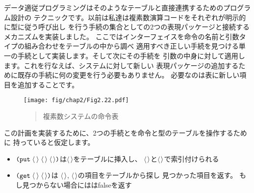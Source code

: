 データ適従プログラミングはそのようなテーブルと直接連携するためのプログラム設計の
テクニックです。以前は私達は複素数演算コードをそれぞれが明示的に型に従う呼び出し
を行う手続の集合としての2つの表現パッケージと接続するメカニズムを実装しました。
ここではインターフェイスを命令の名前と引数タイプの組み合わせをテーブルの中から調べ
適用すべき正しい手続を見つける単一の手続として実装します。そして次にその手続を
引数の中身に対して適用します。これを行なえば、システムに対して新しい
表現パッケージの追加するために既存の手続に何の変更を行う必要もありません。
必要なのは表に新しい項目を追加することです。

\begin{figure}[tb]
\label{Figure 2.22}
\centering
\begin{comment}
\begin{quote}
\heading{Figure 2.22:} Table of operations for the complex-number system.

\begin{example}
           |               Types
Operations | Polar           | Rectangular
===========+=================+======================
real-part  | real-part-polar | real-part-rectangular
imag-part  | imag-part-polar | imag-part-rectangular
magnitude  | magnitude-polar | magnitude-rectangular
angle      | angle-polar     | angle-rectangular
\end{example}
\end{quote}
\end{comment}
\texttt{[image: fig/chap2/Fig2.22.pdf]}
\begin{quote}
 複素数システムの命令表
\end{quote}
\end{figure}

\noindent
この計画を実装するために、2つの手続とを命令と型のテーブルを操作するために
持っていると仮定します。

\begin{itemize}

\item
\( \hbox{\tt(put}\;\langle \)\( \kern0.1em\rangle\;\langle \)\( \kern0.08em\rangle\;\langle \)\( \kern0.08em\rangle\hbox{\tt)} \)は\( \langle \)\( \kern0.08em\rangle \)をテーブルに挿入し、
\( \langle \)\( \kern0.1em\rangle \)と\( \langle \)\( \kern0.08em\rangle \)で索引付けられる

\item
\( \hbox{\tt(get}\;\langle \)\( \kern0.1em\rangle\;\langle \)\( \kern0.08em\rangle\hbox{\tt)} \)は
\( \langle \)\( \kern0.08em\rangle \), \( \langle \)\( \kern0.08em\rangle \)の項目をテーブルから探し
見つかった項目を返す。 もし見つからない場合にははfalseを返す

\end{itemize}

